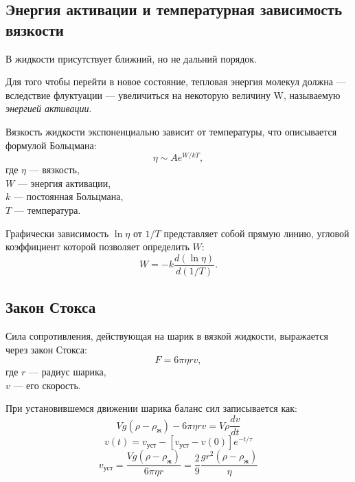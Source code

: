 \documentclass[a4paper,12pt]{article} %
\begin{document}
\medskip 

\subsection*{Энергия активации и температурная зависимость вязкости}
В жидкости присутствует ближний, но не дальний порядок.

Для того чтобы перейти в новое состояние, тепловая энергия молекул должна — вследствие флуктуации — увеличиться на некоторую величину W, называемую \textit{энергией активации}.

\medskip

Вязкость жидкости экспоненциально зависит от температуры, что описывается формулой Больцмана:
\begin{equation}
    \eta \sim A e^{W/kT},
\end{equation}
где $\eta$ — вязкость, \\
$W$ — энергия активации, \\
$k$ — постоянная Больцмана, \\
$T$ — температура.

Графически зависимость $\ln \eta$ от $1/T$ представляет собой прямую линию, угловой коэффициент которой позволяет определить $W$:
\begin{equation}
    W = -k \frac{d(\ln \eta)}{d(1/T)}.
\end{equation}

\subsection*{Закон Стокса}
Сила сопротивления, действующая на шарик в вязкой жидкости, выражается через закон Стокса:
\begin{equation}
    F = 6\pi \eta r v,
\end{equation}
где $r$ — радиус шарика, \\
$v$ — его скорость.

При установившемся движении шарика баланс сил записывается как:
\begin{equation}
    V g(\rho - \rho_\text{ж}) - 6 \pi \eta r v = V \rho \frac{d v}{d t}
\end{equation}
\begin{equation}
	v(t) = v_\text{уст} - [v_\text{уст} - v(0)]e^{-t/\tau}
\end{equation}
\begin{equation}
	v_{уст} = \frac{Vg (\rho - \rho_\text{ж})}{6 \pi \eta r} = \frac{2}{9} \frac{g r^2 (\rho - \rho_\text{ж})}{\eta}
\end{equation}
\end{document}
